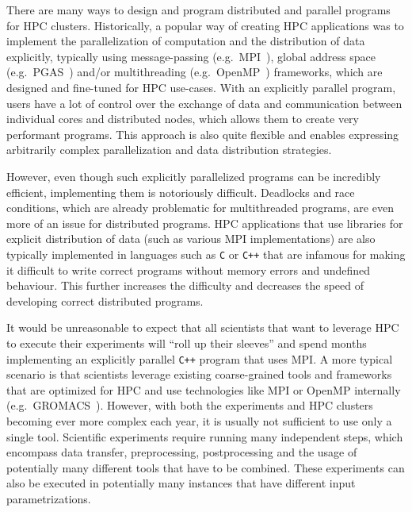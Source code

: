 There are many ways to design and program distributed and parallel programs for HPC clusters.
Historically, a popular way of creating HPC applications was to implement the parallelization of
computation and the distribution of data explicitly, typically using message-passing (e.g.\
MPI~\cite{mpi}), global address space (e.g.\ PGAS~\cite{pgas}) and/or
multithreading (e.g.\ OpenMP~\cite{openmp}) frameworks, which are designed and fine-tuned
for HPC use-cases. With an explicitly parallel program, users have a lot of control over the
exchange of data and communication between individual cores and distributed nodes, which allows
them to create very performant programs. This approach is also quite flexible and enables
expressing arbitrarily complex parallelization and data distribution strategies.

However, even though such explicitly parallelized programs can be incredibly efficient,
implementing them is notoriously difficult. Deadlocks and race conditions, which are already
problematic for multithreaded programs, are even more of an issue for distributed programs. HPC
applications that use libraries for explicit distribution of data (such as various MPI
implementations) are also typically implemented in languages such as \texttt{C} or
\texttt{C++} that are infamous for making it difficult to write correct programs without
memory errors and undefined behaviour. This further increases the difficulty and decreases the
speed of developing correct distributed programs.

It would be unreasonable to expect that all scientists that want to leverage HPC to execute their
experiments will ``roll up their sleeves'' and spend months implementing an explicitly parallel
\texttt{C++} program that uses MPI. A more typical scenario is that scientists leverage
existing coarse-grained tools and frameworks that are optimized for HPC and use technologies like
MPI or OpenMP internally (e.g.\ GROMACS~\cite{gromacs}). However, with both the experiments
and HPC clusters becoming ever more complex each year, it is usually not sufficient to use only a
single tool. Scientific experiments require running many independent steps, which encompass data
transfer, preprocessing, postprocessing and the usage of potentially many different tools that have
to be combined. These experiments can also be executed in potentially many instances that have
different input parametrizations.

